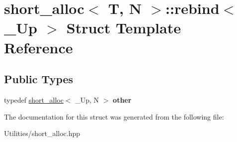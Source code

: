\hypertarget{structshort__alloc_1_1rebind}{\section{short\+\_\+alloc$<$ T, N $>$\+:\+:rebind$<$ \+\_\+\+Up $>$ Struct Template Reference}
\label{structshort__alloc_1_1rebind}
}
\subsection*{Public Types}
\begin{DoxyCompactItemize}
\item 
\hypertarget{structshort__alloc_1_1rebind_a6a1de2745616e97db8afa887b599b561}{typedef \hyperlink{classshort__alloc}{short\+\_\+alloc}$<$ \+\_\+\+Up, N $>$ {\bfseries other}}\label{structshort__alloc_1_1rebind_a6a1de2745616e97db8afa887b599b561}

\end{DoxyCompactItemize}


The documentation for this struct was generated from the following file\+:\begin{DoxyCompactItemize}
\item 
Utilities/short\+\_\+alloc.\+hpp\end{DoxyCompactItemize}
